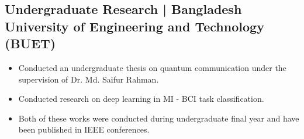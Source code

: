 \documentclass[letterpaper,11pt]{article}
\begin{document}
\vspace{-1.5em} %
\subsection*{Undergraduate Research | Bangladesh University of Engineering and Technology (BUET)}

\begin{itemize}[left=0cm]
    \setlength\itemsep{-0.025em} %
    \setlength\parskip{-0.025em} %
    \fontsize{9.6}{11.2}\selectfont
  \item Conducted an undergraduate thesis on quantum communication under the supervision of Dr. Md. Saifur Rahman.
  \item Conducted research on deep learning in MI - BCI task classification.
  \item Both of these works were conducted during undergraduate final year and have been published in IEEE conferences.
\end{itemize}
\end{document}
